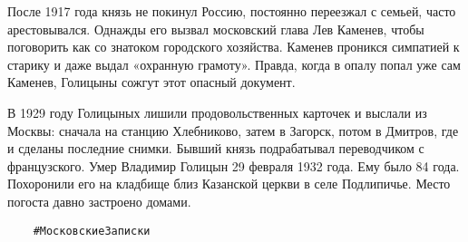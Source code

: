 После 1917 года князь не покинул Россию, постоянно переезжал с семьей, часто
арестовывался. Однажды его вызвал московский глава Лев Каменев, чтобы
поговорить как со знатоком городского хозяйства. Каменев проникся симпатией к
старику и даже выдал «охранную грамоту». Правда, когда в опалу попал уже сам
Каменев, Голицыны сожгут этот опасный документ.

В 1929 году Голицыных лишили продовольственных карточек и выслали из Москвы:
сначала на станцию Хлебниково, затем в Загорск, потом в Дмитров, где и сделаны
последние снимки. Бывший князь подрабатывал переводчиком с французского. Умер
Владимир Голицын 29 февраля 1932 года. Ему было 84 года. Похоронили его на
кладбище близ Казанской церкви в селе Подлипичье. Место погоста давно застроено
домами.

\begin{verbatim}
	#МосковскиеЗаписки
\end{verbatim}
